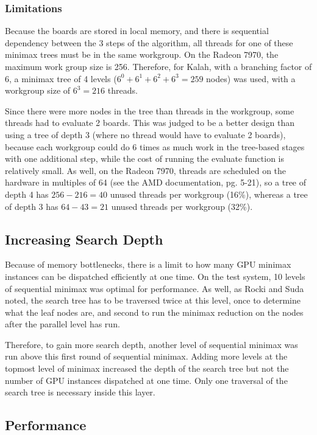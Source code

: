 \documentclass{article}
\begin{document}
\subsubsection{Limitations}
Because the boards are stored in local memory, and there is sequential dependency between the 3 steps of the algorithm, all threads for one of these minimax trees must be in the same workgroup. On the Radeon 7970, the maximum work group size is 256. Therefore, for Kalah, with a branching factor of 6, a minimax tree of 4 levels ($6^0 + 6^1 + 6^2 + 6^3 = 259$ nodes) was used, with a workgroup size of $6^3 = 216$ threads.

Since there were more nodes in the tree than threads in the workgroup, some threads had to evaluate 2 boards. This was judged to be a better design than using a tree of depth 3 (where no thread would have to evaluate 2 boards), because each workgroup could do 6 times as much work in the tree-based stages with one additional step, while the cost of running the evaluate function is relatively small. As well, on the Radeon 7970, threads are scheduled on the hardware in multiples of 64 (see the AMD documentation\cite{amdapp}, pg. 5-21), so a tree of depth 4 has $256 - 216 = 40$ unused threads per workgroup (16\%), whereas a tree of depth 3 has $64 - 43 = 21$ unused threads per workgroup (32\%).

\subsection{Increasing Search Depth}
Because of memory bottlenecks, there is a limit to how many GPU minimax instances can be dispatched efficiently at one time. On the test system, 10 levels of sequential minimax was optimal for performance. As well, as Rocki and Suda\cite{rockisuda10} noted, the search tree has to be traversed twice at this level, once to determine what the leaf nodes are, and second to run the minimax reduction on the nodes after the parallel level has run.

Therefore, to gain more search depth, another level of sequential minimax was run above this first round of sequential minimax. Adding more levels at the topmost level of minimax increased the depth of the search tree but not the number of GPU instances dispatched at one time. Only one traversal of the search tree is necessary inside this layer.

\subsection{Performance}
\end{document}

